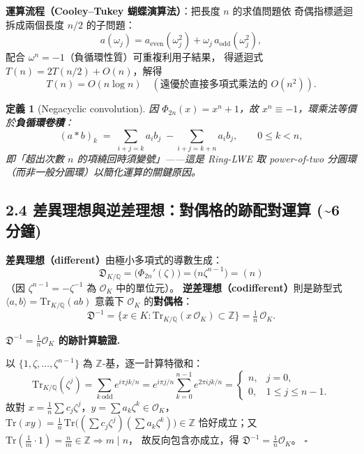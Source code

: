\documentclass[10.5pt, a4paper]{article}
\theoremstyle{cpt}
\newtheorem{definition}{定義}
\newenvironment{proofbox}[1][證明]{%
  \begin{tcolorbox}[colback=thmfill, colframe=accent!40,
    breakable, left=5pt, right=5pt, top=3pt, bottom=3pt, boxrule=0.4pt]
  \noindent\textbf{\color{accent}#1.}\quad\small
}{%
  \hfill$\square$\end{tcolorbox}\vspace{-1pt}
}
\begin{document}
\textbf{運算流程（Cooley–Tukey 蝴蝶演算法）}：把長度 $n$ 的求值問題依
奇偶指標遞迴拆成兩個長度 $n/2$ 的子問題：
\[
  a(\omega_j) = a_{\mathrm{even}}(\omega_j^2) + \omega_j\, a_{\mathrm{odd}}(\omega_j^2),
\]
配合 $\omega^{n} = -1$（負循環性質）可重複利用子結果，
得遞迴式 $T(n)=2T(n/2)+O(n)$，解得
\[
  T(n) = O(n\log n) \quad (\text{遠優於直接多項式乘法的 } O(n^2)).
\]

\begin{definition}[Negacyclic convolution]
  因 $\Phi_{2n}(x)=x^n+1$，故 $x^n \equiv -1$，環乘法等價於\textbf{負循環卷積}：
  \[
    (a * b)_k \;=\; \sum_{i+j=k} a_i b_j \;-\!\!\sum_{i+j=k+n}\!\! a_i b_j ,
    \qquad 0\le k < n,
  \]
  即「超出次數 $n$ 的項繞回時須變號」——這是 Ring-LWE 取
  power-of-two 分圓環（而非一般分圓環）以簡化運算的關鍵原因。
\end{definition}

\subsection{2.4 \;差異理想與逆差理想：對偶格的跡配對運算 \hfill {\footnotesize\color{gray}(\textasciitilde 6 分鐘)}}

\textbf{差異理想（different）}由極小多項式的導數生成：
\[
  \mathfrak{D}_{K/\mathbb{Q}} = \bigl(\Phi_{2n}'(\zeta)\bigr) = \bigl(n\zeta^{n-1}\bigr) = (n)
\]
（因 $\zeta^{n-1}=-\zeta^{-1}$ 為 $\mathcal{O}_K$ 中的單位元）。
\textbf{逆差理想（codifferent）}則是跡型式 $\langle a,b\rangle = \mathrm{Tr}_{K/\mathbb{Q}}(ab)$
意義下 $\mathcal{O}_K$ 的\textbf{對偶格}：
\[
  \mathfrak{D}^{-1} = \{x\in K : \mathrm{Tr}_{K/\mathbb{Q}}(x\,\mathcal{O}_K)\subset\mathbb{Z}\} = \tfrac{1}{n}\,\mathcal{O}_K .
\]

\begin{proofbox}[$\mathfrak{D}^{-1}=\tfrac{1}{n}\mathcal{O}_K$ 的跡計算驗證]
  以 $\{1,\zeta,\ldots,\zeta^{n-1}\}$ 為 $\mathbb{Z}$-基，逐一計算特徵和：
  \[
    \mathrm{Tr}_{K/\mathbb{Q}}(\zeta^j)
    = \sum_{k\ \mathrm{odd}} e^{i\pi jk/n}
    = e^{i\pi j/n}\sum_{k=0}^{n-1} e^{2\pi i jk/n}
    = \begin{cases} n, & j=0,\\[2pt] 0, & 1\le j\le n-1.\end{cases}
  \]
  故對 $x=\frac1n\sum c_j\zeta^j$，$y=\sum a_k\zeta^k\in\mathcal{O}_K$，
  $\mathrm{Tr}(xy)=\frac1n\,\mathrm{Tr}\bigl((\sum c_j\zeta^j)(\sum a_k\zeta^k)\bigr)\in\mathbb{Z}$
  恰好成立；又 $\mathrm{Tr}(\frac1m\cdot 1)=\frac{n}{m}\in\mathbb{Z} \Rightarrow m\mid n$，
  故反向包含亦成立，得 $\mathfrak{D}^{-1}=\frac1n\mathcal{O}_K$。
\end{proofbox}
\end{document}
